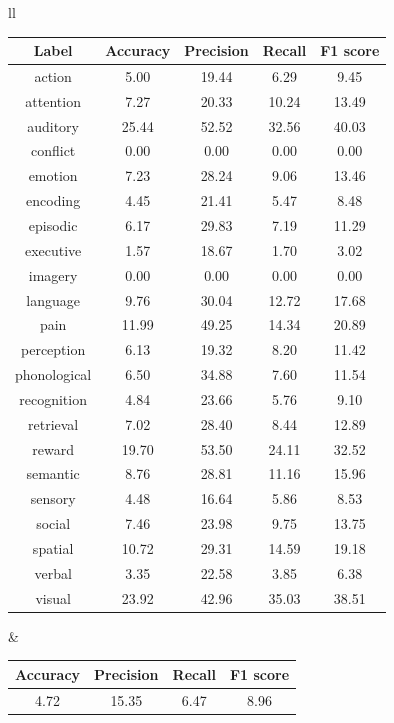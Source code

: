 \documentclass{article} %
\begin{document}
\begin{table}[h]
\begin{center}
\begin{tabular}{ll}
\begin{tabular}{|c|c|c|c|c|}
\hline
 \bf{Label}  & \bf{Accuracy} & \bf{Precision} & \bf{Recall}    & \bf{F1 score} \\ \hline
action	& 5.00	& 19.44	& 6.29	& 9.45	\\ \hline 
attention	& 7.27	& 20.33	& 10.24	& 13.49	\\ \hline 
auditory	& 25.44	& 52.52	& 32.56	& 40.03	\\ \hline 
conflict	& 0.00	& 0.00	& 0.00	& 0.00	\\ \hline 
emotion	& 7.23	& 28.24	& 9.06	& 13.46	\\ \hline 
encoding	& 4.45	& 21.41	& 5.47	& 8.48	\\ \hline 
episodic	& 6.17	& 29.83	& 7.19	& 11.29	\\ \hline 
executive	& 1.57	& 18.67	& 1.70	& 3.02	\\ \hline 
imagery	& 0.00	& 0.00	& 0.00	& 0.00	\\ \hline 
language	& 9.76	& 30.04	& 12.72	& 17.68	\\ \hline 
pain	& 11.99	& 49.25	& 14.34	& 20.89	\\ \hline 
perception	& 6.13	& 19.32	& 8.20	& 11.42	\\ \hline 
phonological	& 6.50	& 34.88	& 7.60	& 11.54	\\ \hline 
recognition	& 4.84	& 23.66	& 5.76	& 9.10	\\ \hline 
retrieval	& 7.02	& 28.40	& 8.44	& 12.89	\\ \hline 
reward	& 19.70	& 53.50	& 24.11	& 32.52	\\ \hline 
semantic	& 8.76	& 28.81	& 11.16	& 15.96	\\ \hline 
sensory	& 4.48	& 16.64	& 5.86	& 8.53	\\ \hline 
social	& 7.46	& 23.98	& 9.75	& 13.75	\\ \hline 
spatial	& 10.72	& 29.31	& 14.59	& 19.18	\\ \hline 
verbal	& 3.35	& 22.58	& 3.85	& 6.38	\\ \hline 
visual	& 23.92	& 42.96	& 35.03	& 38.51	\\ \hline 
\end{tabular}
&
\begin{tabular}{|c|c|c|c|}
\hline
 \bf{Accuracy} & \bf{Precision} & \bf{Recall}    & \bf{F1 score} \\ \hline
 4.72	& 15.35	& 6.47	& 8.96	\\ \hline 

\end{tabular}
\end{tabular}
\end{center}
\end{table}
\end{document}
